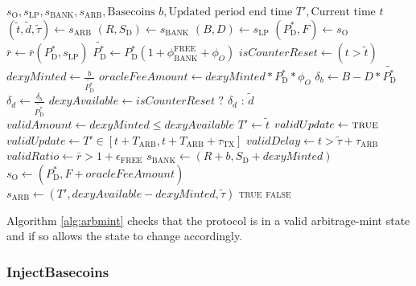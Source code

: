 \documentclass{ifcolog}
\newcommand{\Pdt}{P_{\mathrm{D}}^{*}}
\newcommand{\Sd}{S_{\mathrm{D}}}
\newcommand{\rr}{\bar{r}}
\newcommand{\sbank}{s_{\textrm{BANK}}}
\newcommand{\slp}{s_{\mathrm{LP}}}
\newcommand{\soracle}{s_{\textrm{O}}}
\newcommand{\sarb}{s_{\textrm{ARB}}}
\newcommand{\tautx}{\tau_{\textrm{TX}}}
\newcommand{\epsilonfree}{\epsilon_{\textrm{FREE}}}
\begin{document}
\begin{algorithm}[H]
\caption{ArbMint}\label{alg:arbmint}
\begin{algorithmic}[1]
  \Require $\soracle, \slp, \sbank, \sarb, \textrm{Basecoins } b, \textrm{Updated period end time } T', \textrm{Current time } t$
  \State $(\tilde{t}, \tilde{d}, \tilde{\tau}) \gets \sarb$
  \State $(R, \Sd) \gets \sbank$
  \State $(B, D) \gets \slp$
  \State $(\Pdt, F) \gets \soracle$  
  \State $\rr \gets \rr(\Pdt, \slp)$
  \State $\tilde{\Pdt} \gets \Pdt(1 + \phi_{\textrm{BANK}}^{\textrm{FREE}} + \phi_{O})$
  \State $isCounterReset \gets (t > \tilde{t})$ 
  \State $dexyMinted \gets \frac{b}{\tilde{\Pdt}}$
  \State $oracleFeeAmount \gets dexyMinted * \Pdt * \phi_{O}$
  \State $\delta_{b} \gets B - D * \tilde{\Pdt}$
  \State $\delta_{d} \gets \frac{\delta_{b}}{\tilde{\Pdt}}$ 
  \State $dexyAvailable \gets isCounterReset \textrm{ ? } \delta_{d} \textrm{ : } \tilde{d}$
  \State $validAmount \gets dexyMinted \le dexyAvailable$
    \State $T' \gets \tilde{t}$
    \State $validUpdate \gets \textsc{true}$
  \Else 
    \State $validUpdate \gets T' \in [t + T_{\textrm{ARB}}, t + T_{\textrm{ARB}} + \tautx]$  
  \EndIf
  \State $validDelay \gets t > \tilde{\tau} + \tau_{\textrm{ARB}}$
  \State $validRatio \gets \rr > 1 + \epsilonfree$
    \State $\sbank \gets (R + b, \Sd + dexyMinted)$
    \State $\soracle \gets (\Pdt, F + oracleFeeAmount)$
    \State $\sarb \gets (T', dexyAvailable - dexyMinted, \tilde{\tau})$
    \State \Return \textsc{true}
  \Else
    \State \Return \textsc{false}
  \EndIf
\end{algorithmic}
\end{algorithm}

Algorithm \ref{alg:arbmint} checks that the protocol is in a valid arbitrage-mint state and if so allows the state to change accordingly.

\newpage 

\subsubsection{InjectBasecoins}
\end{document}
